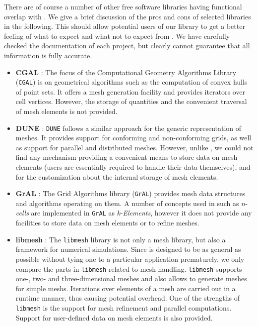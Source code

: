 There are of course a number of other free software libraries having functional overlap with {\ViennaGrid}.
We give a brief discussion of the pros and cons of selected libraries in the following.
This should allow potential users of our library to get a better feeling of what to expect and what not to expect from {\ViennaGrid}.
We have carefully checked the documentation of each project, but clearly cannot guarantee that all information is fully accurate.
\begin{itemize}
  \item \textbf{CGAL} \cite{CGAL}: The focus of the Computational Geometry Algorithms Library (\texttt{CGAL}) is on geometrical algorithms such as the computation of convex hulls of point sets.
        It offers a mesh generation facility and provides iterators over cell vertices.
        However, the storage of quantities and the convenient traversal of mesh elements is not provided.

  \item \textbf{DUNE} \cite{DUNE}: \texttt{DUNE} follows a similar approach for the generic representation of meshes.
        It provides support for conforming and non-conforming grids, as well as support for parallel and distributed meshes.
        However, unlike {\ViennaGrid}, we could not find any mechanism providing a convenient means to store data on mesh elements (users are essentially required to handle their data themselves), and for the customization about the internal storage of mesh elements.

  \item \textbf{GrAL} \cite{GrAL}: The Grid Algorithms library (\texttt{GrAL}) provides mesh data structures and algorithms operating on them.
        A number of concepts used in {\ViennaGrid} such as $n$-\textit{cells} are implemented in \texttt{GrAL} as $k$-\textit{Elements}, however it does not provide any facilities to store data on mesh elements or to refine meshes.

  \item \textbf{libmesh} \cite{libmesh}: The \texttt{libmesh} library is not only a mesh library, but also a framework for numerical simulations.
        Since {\ViennaGrid} is designed to be as general as possible without tying one to a particular application prematurely, we only compare the parts in \texttt{libmesh} related to mesh handling.
        \texttt{libmesh} supports one-, two- and three-dimensional meshes and also allows to generate meshes for simple meshs.
        Iterations over elements of a mesh are carried out in a runtime manner, thus causing potential overhead.
        One of the strengths of \texttt{libmesh} is the support for mesh refinement and parallel computations.
        Support for user-defined data on mesh elements is also provided.


\end{itemize}
